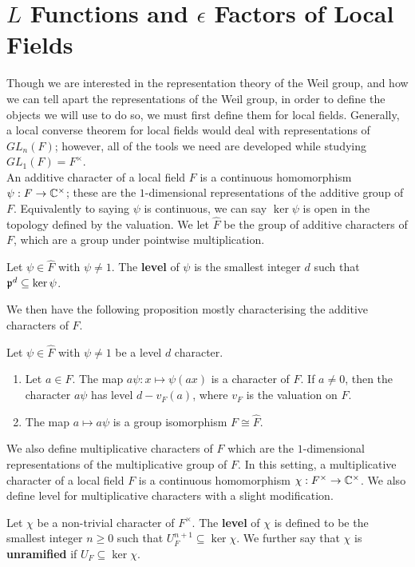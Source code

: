 \section{$L$ Functions and $\epsilon$ Factors of Local Fields}
\label{sec:Leps-LF}
Though we are interested in the representation theory of the Weil group, and how we can tell apart the representations of the Weil group, in order to define the objects we will use to do so, we must first define them for local fields.
Generally, a local converse theorem for local fields would deal with representations of $GL_n(F)$; however, all of the tools we need are developed while studying $GL_1(F) = F^\times$.\\

An additive character of a local field $F$ is a continuous homomorphism $\psi: F \to \mathbb{C}^\times$; these are the $1$-dimensional representations of the additive group of $F$.
Equivalently to saying $\psi$ is continuous, we can say $\ker \psi$ is open in the topology defined by the valuation.
We let $\hat{F}$ be the group of additive characters of $F$, which are a group under pointwise multiplication.
\begin{defn}
  Let $\psi \in \hat{F}$ with $\psi \neq 1$.
  The \textbf{level} of $\psi$ is the smallest integer $d$ such that $\mathfrak{p}^d \subseteq \ker \psi$.
\end{defn}
We then have the following proposition mostly characterising the additive characters of $F$.
\begin{prop}
  Let $\psi \in \hat{F}$ with $\psi \neq 1$ be a level $d$ character.
  \begin{enumerate}
    \item Let $a \in F$. The map $a \psi : x \mapsto \psi(ax)$ is a character of $F$. If $a \neq 0$, then the character $a \psi$ has level $d - v_F(a)$, where $v_F$ is the valuation on $F$.
    \item The map $a \mapsto a \psi$ is a group isomorphism $F \cong \hat{F}$.
  \end{enumerate}
\end{prop}

We also define multiplicative characters of $F$ which are the $1$-dimensional representations of the multiplicative group of $F$.
In this setting, a multiplicative character of a local field $F$ is a continuous homomorphism $\chi : F^\times \to \mathbb{C}^\times$.
We also define level for multiplicative characters with a slight modification.
\begin{defn}
  Let $\chi$ be a non-trivial character of $F^\times$.
  The \textbf{level} of $\chi$ is defined to be the smallest integer $n \geq 0$ such that $U^{n+1}_F \subseteq \ker \chi$.
  We further say that $\chi$ is \textbf{unramified} if $U_F \subseteq \ker \chi$.
\end{defn}

